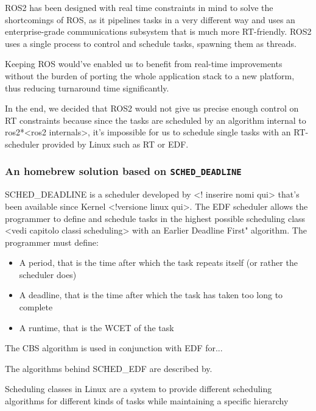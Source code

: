 \documentclass[a4paper,12pt]{report}
\begin{document}
ROS2 has been designed with real time constraints in mind to solve the shortcomings of ROS\cite{ros2-realtime-intro}, as it pipelines tasks in a very different way and uses an enterprise-grade communications subsystem that is much more RT-friendly. ROS2 uses a single process to control and schedule tasks, spawning them as threads.

Keeping ROS would've enabled us to benefit from real-time improvements without the burden of porting the whole application stack to a new platform, thus reducing turnaround time significantly. 

In the end, we decided that ROS2 would not give us precise enough control on RT constraints because since the tasks are scheduled by an algorithm internal to ros2*<ros2 internals>, it's impossible for us to schedule single tasks with an RT-scheduler provided by Linux such as RT or EDF. 

\subsubsection{An homebrew solution based on \texttt{SCHED\_DEADLINE}}

SCHED\_DEADLINE is a scheduler developed by <! inserire nomi qui> that's been available since Kernel <!versione linux qui>. The EDF scheduler allows the programmer to define and schedule tasks in the highest possible scheduling class <vedi capitolo classi scheduling> with an Earlier Deadline First" algorithm. The programmer must define:

\begin{itemize}
    \item A period, that is the time after which the task repeats itself (or rather the scheduler does)
    \item A deadline, that is the time after which the task has taken too long to complete
    \item A runtime, that is the WCET of the task
\end{itemize}

The CBS algorithm is used in conjunction with EDF for...

The algorithms behind SCHED\_EDF are described by.

Scheduling classes in Linux are a system to provide different scheduling algorithms for different kinds of tasks while maintaining a specific hierarchy 
\end{document}
